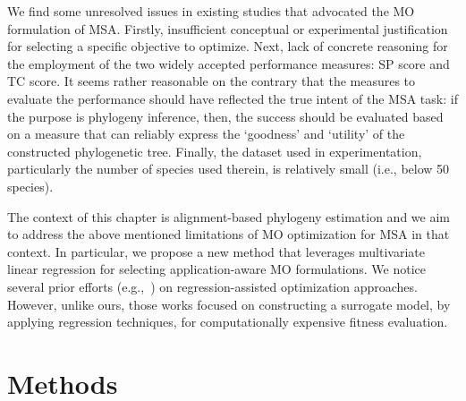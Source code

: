 We find some unresolved issues in existing studies that advocated the MO formulation of MSA. Firstly, insufficient conceptual or experimental justification for selecting a specific objective to optimize. Next, lack of concrete reasoning for the employment of the two widely accepted performance measures: SP score and TC score. It seems rather reasonable on the contrary that the measures to evaluate the performance should have  reflected the true intent of the MSA task: 
if the purpose is phylogeny inference, then, the success should be evaluated based on a measure that can reliably express the `goodness' and `utility' of the constructed phylogenetic tree. Finally, the dataset used in experimentation, particularly the number of species used therein, is relatively small (i.e., below 50 species).


The context of this chapter is alignment-based phylogeny estimation and we aim to address the above mentioned limitations of MO optimization for MSA in that context. In particular, we propose a new method that leverages multivariate linear regression for selecting application-aware MO formulations. We notice several prior efforts (e.g.,~\citep{lu2012classification, zhou2005study}) on regression-assisted optimization approaches. However, unlike ours, those works focused on constructing a surrogate model, by applying regression techniques, for computationally expensive fitness evaluation.


\section{Methods}
\label{sec:methods}

